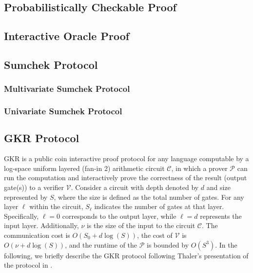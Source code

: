 \subsection{Probabilistically Checkable Proof}

\subsection{Interactive Oracle Proof}





\subsection{Sumchek Protocol}

\subsubsection{Multivariate Sumchek Protocol}

\subsubsection{Univariate Sumchek Protocol}


\subsection{GKR Protocol}


GKR \cite{GKR2008} is a public coin interactive proof protocol for any language computable by a log-space uniform layered (fan-in 2) arithmetic circuit $\mathcal{C}$, in which a prover $\mathcal{P}$ can run the computation and interactively prove the correctness of the result (output gate(s)) to a verifier $\mathcal{V}$. Consider a circuit with depth denoted by $d$ and size represented by $S$, where the size is defined as the total number of gates. For any layer $\ell$ within the circuit, $S_\ell$ indicates the number of gates at that layer. Specifically, $\ell=0$ corresponds to the output layer, while $\ell=d$ represents the input layer. Additionally, $\nu$ is the size of the input to  the circuit $\mathcal{C}$. The communication cost is $O(S_0 + d\log(S))$, the cost of $\mathcal{V}$  is $O(\nu + d\log(S))$, and the runtime of the $\mathcal{P}$ is bounded by $O(S^3)$. In the following, we briefly describe the GKR protocol following Thaler's presentation of the protocol in \cite{Thaler2022}.\\


